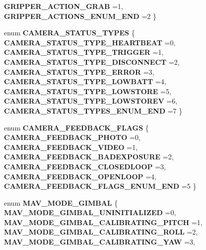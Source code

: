 \begin{DoxyCompactItemize}
\textbf{ G\+R\+I\+P\+P\+E\+R\+\_\+\+A\+C\+T\+I\+O\+N\+\_\+\+G\+R\+AB} =1, 
\textbf{ G\+R\+I\+P\+P\+E\+R\+\_\+\+A\+C\+T\+I\+O\+N\+S\+\_\+\+E\+N\+U\+M\+\_\+\+E\+ND} =2
 \}
\item 
enum \textbf{ C\+A\+M\+E\+R\+A\+\_\+\+S\+T\+A\+T\+U\+S\+\_\+\+T\+Y\+P\+ES} \{ \newline
\textbf{ C\+A\+M\+E\+R\+A\+\_\+\+S\+T\+A\+T\+U\+S\+\_\+\+T\+Y\+P\+E\+\_\+\+H\+E\+A\+R\+T\+B\+E\+AT} =0, 
\textbf{ C\+A\+M\+E\+R\+A\+\_\+\+S\+T\+A\+T\+U\+S\+\_\+\+T\+Y\+P\+E\+\_\+\+T\+R\+I\+G\+G\+ER} =1, 
\textbf{ C\+A\+M\+E\+R\+A\+\_\+\+S\+T\+A\+T\+U\+S\+\_\+\+T\+Y\+P\+E\+\_\+\+D\+I\+S\+C\+O\+N\+N\+E\+CT} =2, 
\textbf{ C\+A\+M\+E\+R\+A\+\_\+\+S\+T\+A\+T\+U\+S\+\_\+\+T\+Y\+P\+E\+\_\+\+E\+R\+R\+OR} =3, 
\newline
\textbf{ C\+A\+M\+E\+R\+A\+\_\+\+S\+T\+A\+T\+U\+S\+\_\+\+T\+Y\+P\+E\+\_\+\+L\+O\+W\+B\+A\+TT} =4, 
\textbf{ C\+A\+M\+E\+R\+A\+\_\+\+S\+T\+A\+T\+U\+S\+\_\+\+T\+Y\+P\+E\+\_\+\+L\+O\+W\+S\+T\+O\+RE} =5, 
\textbf{ C\+A\+M\+E\+R\+A\+\_\+\+S\+T\+A\+T\+U\+S\+\_\+\+T\+Y\+P\+E\+\_\+\+L\+O\+W\+S\+T\+O\+R\+EV} =6, 
\textbf{ C\+A\+M\+E\+R\+A\+\_\+\+S\+T\+A\+T\+U\+S\+\_\+\+T\+Y\+P\+E\+S\+\_\+\+E\+N\+U\+M\+\_\+\+E\+ND} =7
 \}
\item 
enum \textbf{ C\+A\+M\+E\+R\+A\+\_\+\+F\+E\+E\+D\+B\+A\+C\+K\+\_\+\+F\+L\+A\+GS} \{ \newline
\textbf{ C\+A\+M\+E\+R\+A\+\_\+\+F\+E\+E\+D\+B\+A\+C\+K\+\_\+\+P\+H\+O\+TO} =0, 
\textbf{ C\+A\+M\+E\+R\+A\+\_\+\+F\+E\+E\+D\+B\+A\+C\+K\+\_\+\+V\+I\+D\+EO} =1, 
\textbf{ C\+A\+M\+E\+R\+A\+\_\+\+F\+E\+E\+D\+B\+A\+C\+K\+\_\+\+B\+A\+D\+E\+X\+P\+O\+S\+U\+RE} =2, 
\textbf{ C\+A\+M\+E\+R\+A\+\_\+\+F\+E\+E\+D\+B\+A\+C\+K\+\_\+\+C\+L\+O\+S\+E\+D\+L\+O\+OP} =3, 
\newline
\textbf{ C\+A\+M\+E\+R\+A\+\_\+\+F\+E\+E\+D\+B\+A\+C\+K\+\_\+\+O\+P\+E\+N\+L\+O\+OP} =4, 
\textbf{ C\+A\+M\+E\+R\+A\+\_\+\+F\+E\+E\+D\+B\+A\+C\+K\+\_\+\+F\+L\+A\+G\+S\+\_\+\+E\+N\+U\+M\+\_\+\+E\+ND} =5
 \}
\item 
enum \textbf{ M\+A\+V\+\_\+\+M\+O\+D\+E\+\_\+\+G\+I\+M\+B\+AL} \{ \newline
\textbf{ M\+A\+V\+\_\+\+M\+O\+D\+E\+\_\+\+G\+I\+M\+B\+A\+L\+\_\+\+U\+N\+I\+N\+I\+T\+I\+A\+L\+I\+Z\+ED} =0, 
\textbf{ M\+A\+V\+\_\+\+M\+O\+D\+E\+\_\+\+G\+I\+M\+B\+A\+L\+\_\+\+C\+A\+L\+I\+B\+R\+A\+T\+I\+N\+G\+\_\+\+P\+I\+T\+CH} =1, 
\textbf{ M\+A\+V\+\_\+\+M\+O\+D\+E\+\_\+\+G\+I\+M\+B\+A\+L\+\_\+\+C\+A\+L\+I\+B\+R\+A\+T\+I\+N\+G\+\_\+\+R\+O\+LL} =2, 
\textbf{ M\+A\+V\+\_\+\+M\+O\+D\+E\+\_\+\+G\+I\+M\+B\+A\+L\+\_\+\+C\+A\+L\+I\+B\+R\+A\+T\+I\+N\+G\+\_\+\+Y\+AW} =3, 

\end{DoxyCompactItemize}
